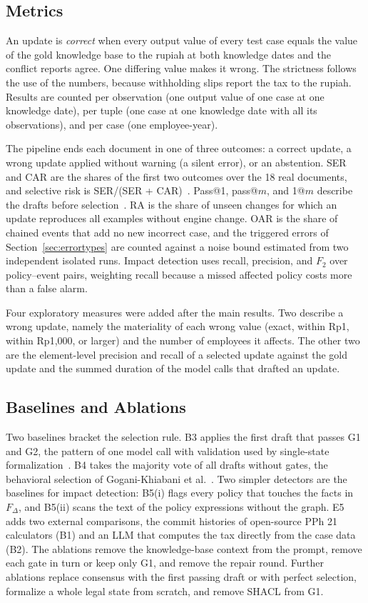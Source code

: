 \subsection{Metrics}
\label{sec:metrics}
An update is \emph{correct} when every output value of every test case equals the value of the gold knowledge base to the rupiah at both knowledge dates and the conflict reports agree. One differing value makes it wrong. The strictness follows the use of the numbers, because withholding slips report the tax to the rupiah. Results are counted per observation (one output value of one case at one knowledge date), per tuple (one case at one knowledge date with all its observations), and per case (one employee-year).

The pipeline ends each document in one of three outcomes: a correct update, a wrong update applied without warning (a silent error), or an abstention. SER and CAR are the shares of the first two outcomes over the 18 real documents, and selective risk is SER/(SER + CAR)~\cite{xin2021abstention}. Pass@1, pass@$m$, and 1@$m$ describe the drafts before selection~\cite{chen2021evaluating,li2022alphacode}. RA is the share of unseen changes for which an update reproduces all examples without engine change. OAR is the share of chained events that add no new incorrect case, and the triggered errors of Section~\ref{sec:errortypes} are counted against a noise bound estimated from two independent isolated runs. Impact detection uses recall, precision, and $F_2$ over policy--event pairs, weighting recall because a missed affected policy costs more than a false alarm.

Four exploratory measures were added after the main results. Two describe a wrong update, namely the materiality of each wrong value (exact, within Rp1, within Rp1,000, or larger) and the number of employees it affects. The other two are the element-level precision and recall of a selected update against the gold update and the summed duration of the model calls that drafted an update.

\subsection{Baselines and Ablations}
Two baselines bracket the selection rule. B3 applies the first draft that passes G1 and G2, the pattern of one model call with validation used by single-state formalization~\cite{veeramani2026neurosymbolic,yadamsuren2026formalization}. B4 takes the majority vote of all drafts without gates, the behavioral selection of Gogani-Khiabani et al.~\cite{goganikhiabani2025maintaining}. Two simpler detectors are the baselines for impact detection: B5(i) flags every policy that touches the facts in $F_\Delta$, and B5(ii) scans the text of the policy expressions without the graph. E5 adds two external comparisons, the commit histories of open-source PPh 21 calculators (B1) and an LLM that computes the tax directly from the case data (B2). The ablations remove the knowledge-base context from the prompt, remove each gate in turn or keep only G1, and remove the repair round. Further ablations replace consensus with the first passing draft or with perfect selection, formalize a whole legal state from scratch, and remove SHACL from G1.

